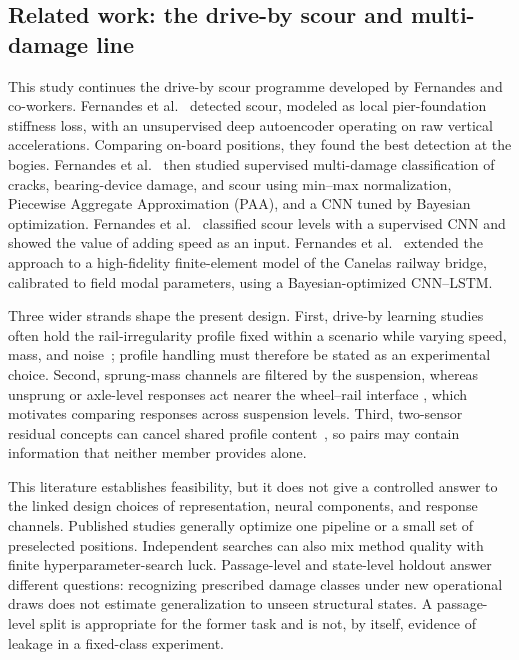 \subsection{Related work: the drive-by scour and multi-damage line}
\label{sec:related}

This study continues the drive-by scour programme developed by Fernandes and
co-workers. Fernandes et al.~\cite{fernandes2024driveby} detected scour,
modeled as local pier-foundation stiffness loss, with an unsupervised deep
autoencoder operating on raw vertical accelerations. Comparing on-board
positions, they found the best detection at the bogies. Fernandes et
al.~\cite{fernandes2025early} then studied supervised multi-damage
classification of cracks, bearing-device damage, and scour using min--max
normalization, Piecewise Aggregate Approximation (PAA), and a CNN tuned by
Bayesian optimization. Fernandes et al.~\cite{fernandes2026early} classified
scour levels with a supervised CNN and showed the value of adding speed as an
input. Fernandes et al.~\cite{fernandes2026canelas} extended the approach to a
high-fidelity finite-element model of the Canelas railway bridge, calibrated to
field modal parameters, using a Bayesian-optimized CNN--LSTM.

Three wider strands shape the present design. First, drive-by learning studies
often hold the rail-irregularity profile fixed within a scenario while varying
speed, mass, and noise~\cite{locke2020using, fernandes2025early}; profile
handling must therefore be stated as an experimental choice. Second,
sprung-mass channels are filtered by the suspension, whereas unsprung or
axle-level responses act nearer the wheel--rail interface
\cite{molodova2011axle, malekjafarian2015review}, which motivates comparing
responses across suspension levels. Third, two-sensor residual concepts can
cancel shared profile content~\cite{keenahan2014use, obrien2015apparent}, so
pairs may contain information that neither member provides alone.

This literature establishes feasibility, but it does not give a controlled
answer to the linked design choices of representation, neural components, and
response channels. Published studies generally optimize one pipeline or a
small set of preselected positions. Independent searches can also mix method
quality with finite hyperparameter-search luck. Passage-level and state-level
holdout answer different questions: recognizing prescribed damage classes
under new operational draws does not estimate generalization to unseen
structural states. A passage-level split is appropriate for the former task
and is not, by itself, evidence of leakage in a fixed-class experiment.

